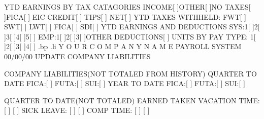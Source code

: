 			 YTD EARNINGS BY TAX CATAGORIES
INCOME[ 	   ]OTHER[	      ]NO TAXES[	    ]FICA[	      ]
	       EIC CREDIT[	      ]    TIPS[	    ] NET[	      ]
YTD TAXES WITHHELD:   FWT[	      ]     SWT[	    ] LWT[	      ]
		     FICA[	      ]     SDI[	    ]
			    YTD EARNINGS AND DEDUCTIONS
SYS:1[		  ]2[		 ]3[		]4[	       ]5[	      ]
EMP:1[		  ]2[		 ]3[		]OTHER DEDUCTIONS[	      ]
UNITS BY PAY TYPE: 1[		 ]2[		]3[	       ]4[	      ]
.bp
.li
		      Y O U R	C O M P A N Y	N A M E
				PAYROLL SYSTEM
  00/00/00		  UPDATE COMPANY LIABILITIES

		   COMPANY LIABILITIES(NOT TOTALED FROM HISTORY)
				QUARTER TO DATE
	  FICA:[	    ] FUTA:[		] SUI:[ 	   ]
				  YEAR TO DATE
	  FICA:[	    ] FUTA:[		] SUI:[ 	   ]

			 QUARTER TO DATE(NOT TOTALED)
					EARNED		   TAKEN
	       VACATION TIME:	   [		]     [ 	   ]
	       SICK LEAVE:	   [		]     [ 	   ]
	       COMP TIME:	   [		]     [ 	   ]

